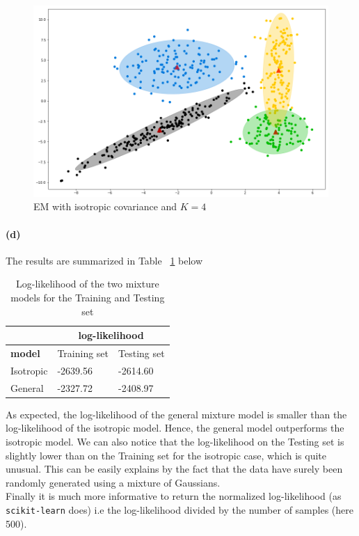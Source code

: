 \documentclass[11pt]{article}
\numberwithin{figure}{section} %
\begin{document}
\begin{figure}[H] 
	\centering
	\includegraphics[width=1\linewidth]{images/general_em.png}
	\caption{EM with isotropic covariance and $K=4$}
	\label{fig:general_em}
\end{figure}

\paragraph{(d)}

The results are summarized in Table ~\ref{table:loglike} below

\begin{table}[H]
\centering
\begin{tabular}{|l|l|l|}
\hline
\textbf{} & \multicolumn{2}{c|}{\textbf{log-likelihood}} \\ \hline
\textbf{model} & Training set & Testing set \\ \hline
Isotropic & -2639.56 & -2614.60 \\ \hline
General & -2327.72 & -2408.97 \\ \hline
\end{tabular}
\caption{Log-likelihood of the two mixture models for the Training and Testing set}
\label{table:loglike}
\end{table}

As expected, the log-likelihood of the general mixture model is smaller than the log-likelihood of the isotropic model. Hence, the general model
outperforms the isotropic model. We can also notice that the log-likelihood on the Testing set is slightly lower than on the Training set for the isotropic case, which is
quite unusual. This can be easily explains by the fact that the data have surely been randomly generated using a mixture of Gaussians. \\
Finally it is much more informative to return the normalized log-likelihood (as \texttt{scikit-learn} does) i.e the log-likelihood divided by the number of samples (here 500).
\end{document}
